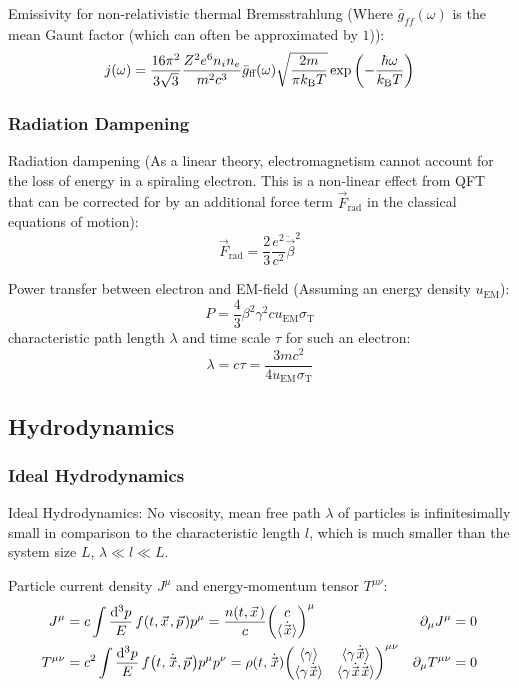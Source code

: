 			\noindent
			Emissivity for non-relativistic thermal Bremsstrahlung (Where $\bar{g}_{ff}(\omega)$ is the mean Gaunt factor (which can often be approximated by $1$)):
			\begin{equation}
				j(\omega) = \frac{16\pi^2}{3\sqrt{3}} \frac{Z^2 e^6 n_i n_e}{m^2 c^3} \bar{g}_{\text{ff}}(\omega) \sqrt{\frac{2m}{\pi k_{\text{B}} T}} \exp\qty(-\frac{\hbar \omega}{k_{\text{B}} T})
			\end{equation}

		\subsubsection{Radiation Dampening}
			Radiation dampening (As a linear theory, electromagnetism cannot account for the loss of energy in a spiraling electron. This is a non-linear effect from QFT that can be corrected for by an additional force term $\vec{F}_\text{rad}$ in the classical equations of motion):
			\begin{equation}
				\vec{F}_\text{rad} = \frac{2}{3} \frac{e^2}{c^2} \ddot{\vec{\beta}}^2
			\end{equation}

			\noindent
			Power transfer between electron and EM-field (Assuming an energy density $u_\text{EM}$):
			\begin{equation}
				P = \frac{4}{3} \beta^2 \gamma^2 c u_\text{EM} \sigma_\text{T}
			\end{equation}
			characteristic path length $\lambda$ and time scale $\tau$ for such an electron:
			\begin{equation}
				\lambda = c\tau = \frac{3 m c^2}{4 u_\text{EM} \sigma_\text{T}}
			\end{equation}



	\subsection{Hydrodynamics}
		\subsubsection{Ideal Hydrodynamics}
			Ideal Hydrodynamics: No viscosity, mean free path $\lambda$ of particles is infinitesimally small in comparison to the characteristic length $l$, which is much smaller than the system size $L$, \ie $\lambda \ll l \ll L$.

			\noindent
			Particle current density $J^\mu$ and energy-momentum tensor $T^{\mu\nu}$:
			\begin{align}
				J^{\mu} &= c \int \frac{\dd^3 p}{E}\, f\qty(t, \vec{x}, \vec{p}) p^{\mu} = \frac{n(t, \vec{x})}{c} \mqty(c\\\avg{\dot{\vec{x}}})^\mu
				&
				\partial_\mu J^{\mu} &= 0 \\
				T^{\mu\nu} &= c^2 \int \frac{\dd^3 p}{E}\, f\qty(t, \dot{\vec{x}}, \vec{p}) p^{\mu} p^{\nu} =\rho(t, \dot{\vec{x}})\mqty(\avg{\gamma} & \avg{\gamma \dot{\vec{x}}} \\ \avg{\gamma \dot{\vec{x}}} & \avg{\gamma\dot{\vec{x}}\dot{\vec{x}}})^{\mu\nu}
				&
				\partial_\mu T^{\mu\nu} &= 0
			\end{align}

